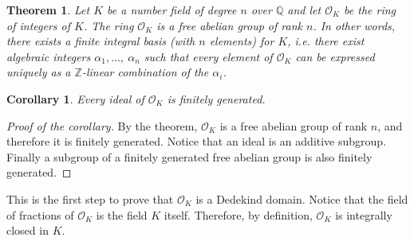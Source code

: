 \documentclass[12pt]{article}
\newtheorem*{thm}{Theorem}
\newtheorem*{cor}{Corollary}
\theoremstyle{definition}
\newcommand{\Ints}{\mathbb{Z}}
\newcommand{\Rats}{\mathbb{Q}}
\begin{document}
\begin{thm}
Let $K$ be a number field of degree $n$ over $\Rats$ and let $\mathcal{O}_K$ be the ring of integers of $K$. The ring $\mathcal{O}_K$ is a free abelian group of rank $n$. In other words, there exists a finite integral basis (with $n$ elements) for $K$, i.e. there exist algebraic integers $\alpha_1,\ldots,\ \alpha_n$ such that every element of $\mathcal{O}_K$ can be expressed uniquely as a $\Ints$-linear combination of the $\alpha_i$. 
\end{thm}

\begin{cor}
Every ideal of $\mathcal{O}_K$ is finitely generated.
\end{cor}
\begin{proof}[Proof of the corollary]
By the theorem, $\mathcal{O}_K$ is a free abelian group of rank $n$, and therefore it is finitely generated. Notice that an ideal is an additive subgroup. Finally a subgroup of a finitely generated free abelian group is also finitely generated.
\end{proof}

This is the first step to prove that $\mathcal{O}_K$ is a Dedekind domain. Notice that the field of fractions of $\mathcal{O}_K$ is the field $K$ itself. Therefore, by definition, $\mathcal{O}_K$ is integrally closed in $K$.
\end{document}

